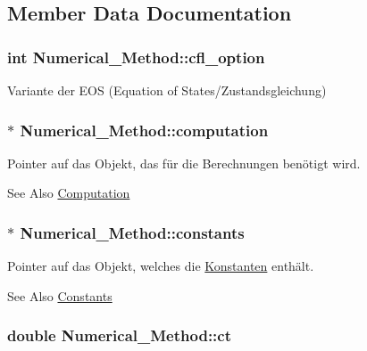 \subsection{Member Data Documentation}
\hypertarget{classNumerical__Method_a3a886e522a1cba5cfc5fcf3023bef720}{
\subsubsection[{cfl\-\_\-option}]{\setlength{\rightskip}{0pt plus 5cm}int Numerical\-\_\-\-Method\-::cfl\-\_\-option}}\label{classNumerical__Method_a3a886e522a1cba5cfc5fcf3023bef720}
Variante der E\-O\-S (Equation of States/\-Zustandsgleichung) \hypertarget{classNumerical__Method_aec80d2974afbd7ed72f7b7592b0f7595}{
\subsubsection[{computation}]{$\ast$ Numerical\-\_\-\-Method\-::computation}}\label{classNumerical__Method_aec80d2974afbd7ed72f7b7592b0f7595}
Pointer auf das Objekt, das für die Berechnungen benötigt wird. \begin{DoxySeeAlso}{See Also}
\hyperlink{classComputation}{Computation} 
\end{DoxySeeAlso}
\hypertarget{classNumerical__Method_a63a7ffa9eb0ab132ae008aa4d1e0dfc6}{
\subsubsection[{constants}]{$\ast$ Numerical\-\_\-\-Method\-::constants}}\label{classNumerical__Method_a63a7ffa9eb0ab132ae008aa4d1e0dfc6}
Pointer auf das Objekt, welches die \hyperlink{classKonstanten}{Konstanten} enthält. \begin{DoxySeeAlso}{See Also}
\hyperlink{classConstants}{Constants} 
\end{DoxySeeAlso}
\hypertarget{classNumerical__Method_a6218be59c261f1fc6ed8f68141f4db71}{
\subsubsection[{ct}]{\setlength{\rightskip}{0pt plus 5cm}double Numerical\-\_\-\-Method\-::ct}}\label{classNumerical__Method_a6218be59c261f1fc6ed8f68141f4db71}
